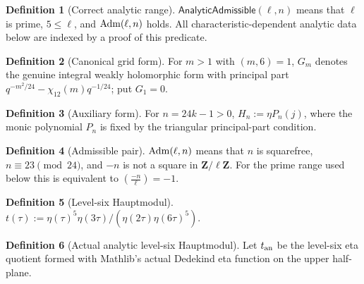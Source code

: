 \documentclass[11pt,a4paper]{article}
\numberwithin{equation}{section}
\theoremstyle{plain}\newtheorem{theorem}{Theorem}[section]\newaliascnt{proposition}{theorem}\newtheorem{proposition}[proposition]{Proposition}\aliascntresetthe{proposition}\newaliascnt{lemma}{theorem}\newtheorem{lemma}[lemma]{Lemma}\aliascntresetthe{lemma}
\theoremstyle{definition}\newaliascnt{definition}{theorem}\newtheorem{definition}[definition]{Definition}\aliascntresetthe{definition}\newaliascnt{notation}{theorem}\newtheorem{notation}[notation]{Notation}\aliascntresetthe{notation}
\providecommand{\lean}[1]{}\providecommand{\leanok}{}
\begin{document}
\begin{definition}[Correct analytic range]\label{def_prime_analytic_data}\lean{SptCM.Repair.AnalyticAdmissible}\leanok
$\mathsf{AnalyticAdmissible}(\ell,n)$ means that $\ell$ is prime,
$5\le\ell$, and $\operatorname{Adm}(\ell,n)$ holds.  All characteristic-dependent analytic
data below are indexed by a proof of this predicate.
\end{definition}
\begin{definition}[Canonical grid form]\label{def_grid_form}\lean{SptCM.Analytic.Repaired.gridForm}\leanok
For $m>1$ with $(m,6)=1$, $G_m$ denotes the genuine integral weakly holomorphic form with principal part $q^{-m^2/24}-\chi_{12}(m)q^{-1/24}$; put $G_1=0$.
\end{definition}
\begin{definition}[Auxiliary form]\label{def_Hn}\lean{SptCM.Analytic.Repaired.auxiliaryHn}\leanok
For $n=24k-1>0$, $H_n:=\eta P_n(j)$, where the monic polynomial $P_n$ is fixed by the triangular principal-part condition.
\end{definition}
\begin{definition}[Admissible pair]\label{def_admissible}\lean{SptCM.Admissible}\leanok
$\operatorname{Adm}(\ell,n)$ means that $n$ is squarefree, $n\equiv23\pmod{24}$, and
$-n$ is not a square in $\mathbf Z/\ell\mathbf Z$.  For the prime range used
below this is equivalent to $\left(\frac{-n}{\ell}\right)=-1$.
\end{definition}
\begin{definition}[Level-six Hauptmodul]\label{def_hauptmodul}\lean{SptCM.hauptmodul}\leanok
$t(\tau):=\eta(\tau)^5\eta(3\tau)/(\eta(2\tau)\eta(6\tau)^5)$.
\end{definition}
\begin{definition}[Actual analytic level-six Hauptmodul]\label{def_analytic_hauptmodul}\lean{SptCM.CM.Repaired.analyticHauptmodul}\leanok
Let $t_{\rm an}$ be the level-six eta quotient formed with Mathlib's actual Dedekind eta function on the upper half-plane.
\end{definition}
\end{document}
